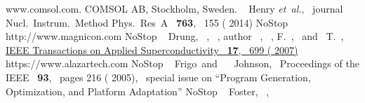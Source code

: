 \documentclass[aps,prd,amsmath,amssymb,reprint,superscriptaddress, nofootinbib,
]{revtex4-1}
\begin{document}
\begin{thebibliography}{33}
{  www.comsol.com. COMSOL AB, Stockholm, Sweden.}  \BibitemOpen
   { {~\bibnamefont
  {Henry}} \emph {et~al.},\ }\href@noop {} { {\bibinfo
  {journal} {Nucl.~Instrum.~Method Phys.~Res~A}\ }\textbf {
  {763}},\  {155 } ( {2014})}\BibitemShut
  {NoStop}  \BibitemOpen
  \href@noop {} {} {{http://www.magnicon.com}}\BibitemShut
  {NoStop}  \BibitemOpen
   { {~\bibnamefont
  {Drung}},  {~},
   {~}, \bibinfo
  {author} {~}, 
  {~},  {\bibfnamefont
  {F.}~}, \ and\  {\bibfnamefont
  {T.}~},\ }\href {\doibase 10.1109/TASC.2007.897403}
  { { {IEEE Transactions on Applied
  Superconductivity}\ }\textbf { {17}},\ 
  {699} ( {2007})}  \BibitemOpen
  \href@noop {} {} {{https://www.alazartech.com}}\BibitemShut
  {NoStop}  \BibitemOpen
   { {~\bibnamefont
  {Frigo}}\ and\  {\ \bibnamefont
  {Johnson}},\ }\href@noop {} { {
  {Proceedings of the IEEE}\ }\textbf { {93}},\ \bibinfo
  {pages} {216} ( {2005})},\  {special issue on
  ``Program Generation, Optimization, and Platform Adaptation''}\BibitemShut
  {NoStop}  \BibitemOpen
   { {\ \bibnamefont
  {Foster}},  {\ }, \
}
\end{thebibliography}
\end{document}
